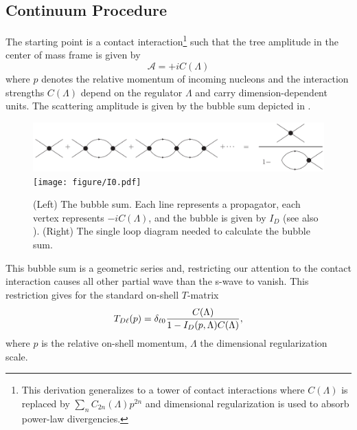 \subsection{Continuum Procedure}\label{sec:continuum}
The starting point is a contact interaction\footnote{This derivation generalizes to a tower of contact interactions where $C(\Lambda)$ is replaced by $\sum_n C_{2n}(\Lambda) p^{2n}$ \cite{Kaplan:1998we,Beane:2003da} and dimensional regularization is used to absorb power-law divergencies.} such that the tree amplitude in the center of mass frame is given by
\begin{equation}
    \mathcal A = + i C(\Lambda)
\end{equation}
where $p$ denotes the relative momentum of incoming nucleons and the interaction strengths $ C(\Lambda)$ depend on the regulator $\Lambda$ and carry dimension-dependent units.
The scattering amplitude is given by the bubble sum depicted in .

\begin{figure}[ht!]
\center
\includegraphics[width=.675\columnwidth]{figure/bubbleSum.pdf}
\hfill
\texttt{[image: figure/I0.pdf]}
\caption{(Left) The bubble sum. Each line represents a propagator, each vertex represents $-i C(\Lambda)$, and the bubble is given by $I_D$ (see also ).
(Right) The single loop diagram needed to calculate the bubble sum.
\label{fig:bubbleSum}}
\end{figure}

This bubble sum is a geometric series and, restricting our attention to the contact interaction causes all other partial wave than the s-wave to vanish.
This restriction gives for the standard on-shell $T$-matrix
\begin{equation}\label{eq:T matrix}
T_{D\ell}(p) = \delta_{\ell 0} \frac{C(\Lambda)}{1-I_D(p,\Lambda) C(\Lambda)},
\end{equation}
where $p$ is the relative on-shell momentum, $\Lambda$ the dimensional regularization scale.

